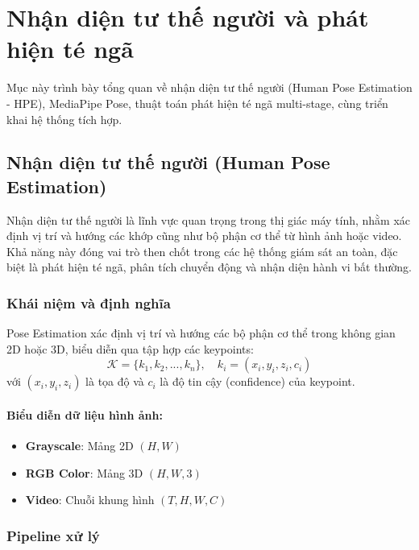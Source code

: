 
\section{Nhận diện tư thế người và phát hiện té ngã}
\label{sec:pose_fall_system}

Mục này trình bày tổng quan về nhận diện tư thế người (Human Pose Estimation - HPE), MediaPipe Pose, thuật toán phát hiện té ngã multi-stage, cùng triển khai hệ thống tích hợp.

\subsection{Nhận diện tư thế người (Human Pose Estimation)}

Nhận diện tư thế người là lĩnh vực quan trọng trong thị giác máy tính, nhằm xác định vị trí và hướng các khớp cũng như bộ phận cơ thể từ hình ảnh hoặc video. Khả năng này đóng vai trò then chốt trong các hệ thống giám sát an toàn, đặc biệt là phát hiện té ngã, phân tích chuyển động và nhận diện hành vi bất thường.

\subsubsection{Khái niệm và định nghĩa}

Pose Estimation xác định vị trí và hướng các bộ phận cơ thể trong không gian 2D hoặc 3D, biểu diễn qua tập hợp các keypoints:
\begin{equation}
\mathcal{K} = \{k_1, k_2, ..., k_n\}, \quad k_i = (x_i, y_i, z_i, c_i)
\end{equation}
với $(x_i, y_i, z_i)$ là tọa độ và $c_i$ là độ tin cậy (confidence) của keypoint.

\paragraph{Biểu diễn dữ liệu hình ảnh:}
\begin{itemize}
    \item \textbf{Grayscale}: Mảng 2D $(H, W)$
    \item \textbf{RGB Color}: Mảng 3D $(H, W, 3)$
    \item \textbf{Video}: Chuỗi khung hình $(T, H, W, C)$
\end{itemize}

\subsubsection{Pipeline xử lý}


